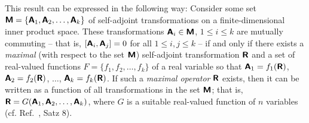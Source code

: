 
This result can be expressed in the following way:
Consider some set $\textsf{\textbf{M}}
=
\{
\textsf{\textbf{A}}_1,
\textsf{\textbf{A}}_2,
\ldots ,
\textsf{\textbf{A}}_k
\}
$
of  self-adjoint transformations on a finite-dimensional inner product space.
These  transformations  $\textsf{\textbf{A}}_i \in \textsf{\textbf{M}}$, $1\le i \le k$
are mutually commuting -- that is, $[\textsf{\textbf{A}}_i,\textsf{\textbf{A}}_j] =0$ for all $1\le i,j \le k$ -- if and only if there exists
a {\em maximal} (with respect to the set $\textsf{\textbf{M}}$) self-adjoint transformation  $\textsf{\textbf{R}}$ and
a set of real-valued functions
$F
=
\{
f_1,
f_2,
\ldots ,
f_k
\}
$ of a real variable so that
$
\textsf{\textbf{A}}_1=f_1 (\textsf{\textbf{R}})
$,
$
\textsf{\textbf{A}}_2=f_2 (\textsf{\textbf{R}})
$,
$\ldots $,
$\textsf{\textbf{A}}_k=f_k (\textsf{\textbf{R}})$.
If such a {\em maximal operator} $\textsf{\textbf{R}}$ exists, then
it can be written as a function of all transformations in the set $\textsf{\textbf{M}}$; that is,
$\textsf{\textbf{R}}=G(\textsf{\textbf{A}}_1,
\textsf{\textbf{A}}_2,
\ldots ,
\textsf{\textbf{A}}_k)$,
where $G$ is a suitable real-valued function of $n$ variables
(cf. Ref.~\cite{v-neumann-31}, Satz 8).

